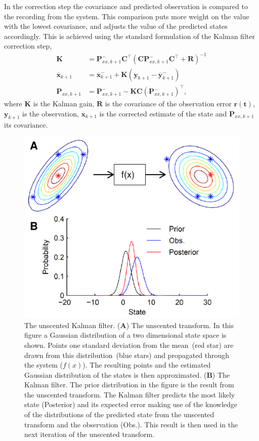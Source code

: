 In the correction step the covariance and predicted observation is compared to the recording from the system. This comparison puts more weight on the value with the lowest covariance, and adjusts the value of the predicted states accordingly. This is achieved using the standard formulation of the Kalman filter correction step,
\begin{align}
\mathbf{K} &= \mathbf{P}_{xx,k+1}^{-}\mathbf{C}^{\top}(\mathbf{C}\mathbf{P}_{xx,k+1}^{-}\mathbf{C}^{\top}+\mathbf{R})^{-1}\\
\overline{\mathbf{x}}_{k+1} &= \overline{\mathbf{x}}_{k+1}^{-} + \mathbf{K}(\mathbf{y}_{k+1}-\overline{\mathbf{y}}_{k+1}^{-})\\
\mathbf{P}_{xx,k+1} &= \mathbf{P}_{xx,k+1}^{-} - \mathbf{K}\mathbf{C}(\mathbf{P}_{xx,k+1}^{-})^{\top},
\end{align} where $\mathbf{K}$ is the Kalman gain, $\mathbf{R}$ is the covariance of the observation error $\mathbf{r(t)}$, $\mathbf{y}_{k+1}$ is the observation, $\overline{\mathbf{x}}_{k+1}$ is the corrected estimate of the state and $\mathbf{P}_{xx,k+1}$ its covariance.

 \begin{figure}
 	\centering
 		\includegraphics{fig/UnscentedKalman.pdf}
 	\caption{The unscented Kalman filter. (\textbf{A}) The unscented transform. In this figure a Gaussian distribution of a two dimensional state space is shown. Points one standard deviation from the mean~(red star) are drawn from this distribution~(blue stars) and propagated through the system ($f(x)$). The resulting points and the estimated Gaussian distribution of the states is then approximated. (\textbf{B}) The Kalman filter. The prior distribution in the figure is the result from the unscented transform. The Kalman filter predicts the most likely state (Posterior) and its expected error making use of the knowledge of the distributions of the predicted state from the unscented transform and the observation (Obs.). This result is then used in the next iteration of the unscented transform.}
 	\label{fig: UKF}
 \end{figure}


